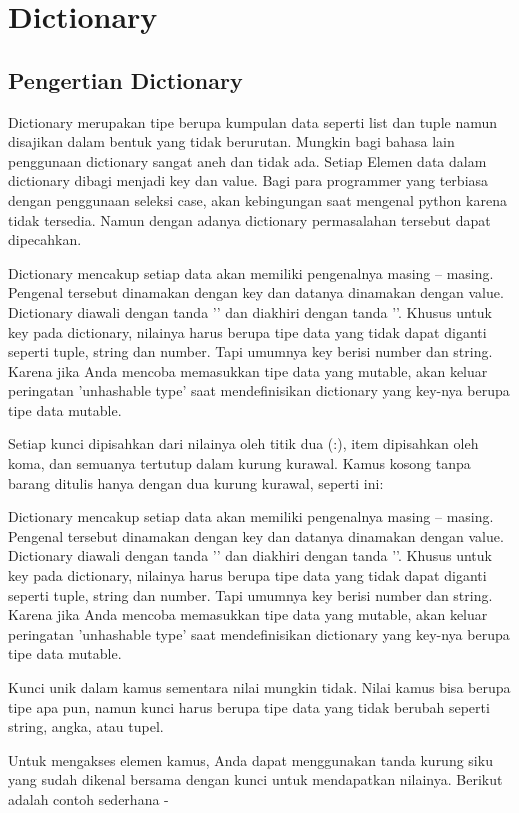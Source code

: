 \section{Dictionary}
\subsection{Pengertian Dictionary}
Dictionary merupakan tipe berupa kumpulan data seperti list dan tuple namun disajikan dalam bentuk yang tidak berurutan. Mungkin bagi bahasa lain penggunaan 
dictionary sangat aneh dan tidak ada. Setiap Elemen data dalam dictionary dibagi menjadi key dan value. Bagi para programmer yang terbiasa dengan penggunaan seleksi case, akan kebingungan saat mengenal 
python karena tidak tersedia. Namun dengan adanya dictionary permasalahan tersebut dapat dipecahkan.


Dictionary mencakup setiap data akan memiliki pengenalnya masing – masing. Pengenal tersebut dinamakan dengan key dan datanya dinamakan dengan value.
Dictionary diawali dengan tanda '{' dan diakhiri dengan tanda '}'. Khusus untuk key pada dictionary, nilainya harus berupa tipe data yang tidak dapat diganti seperti tuple, string dan number. Tapi umumnya key berisi number dan string. Karena jika Anda mencoba memasukkan tipe data yang mutable, akan keluar peringatan 'unhashable type' saat mendefinisikan dictionary yang key-nya
berupa tipe data mutable.


Setiap kunci dipisahkan dari nilainya oleh titik dua (:), item dipisahkan oleh koma, dan semuanya tertutup dalam kurung kurawal. Kamus kosong tanpa barang ditulis hanya dengan dua kurung kurawal, seperti ini: 

Dictionary mencakup setiap data akan memiliki pengenalnya masing – masing. Pengenal tersebut dinamakan dengan key dan datanya dinamakan dengan value.
Dictionary diawali dengan tanda '{' dan diakhiri dengan tanda '}'. Khusus untuk key pada dictionary, nilainya harus berupa tipe data yang tidak dapat diganti seperti tuple, string dan number. Tapi umumnya key berisi number dan string. Karena jika Anda mencoba memasukkan tipe data yang mutable, akan keluar peringatan 'unhashable type' saat mendefinisikan dictionary yang key-nya
berupa tipe data mutable.

Kunci unik dalam kamus sementara nilai mungkin tidak. Nilai kamus bisa berupa tipe apa pun, namun kunci harus berupa tipe data yang tidak berubah seperti string, angka, atau tupel. \par

Untuk mengakses elemen kamus, Anda dapat menggunakan tanda kurung siku yang sudah dikenal bersama dengan kunci untuk mendapatkan nilainya. Berikut adalah contoh sederhana - \par

